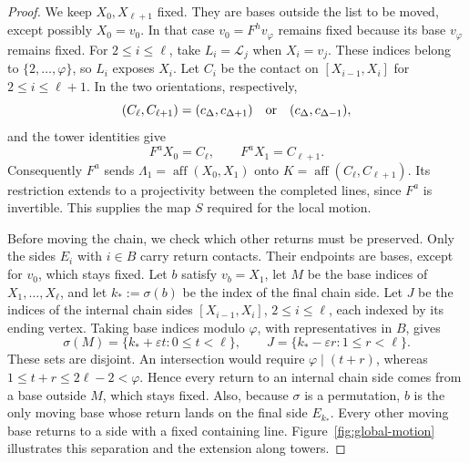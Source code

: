 \documentclass[11pt,a4paper]{article}
\DeclareMathOperator{\aff}{aff}
\theoremstyle{definition}
\theoremstyle{remark}
\numberwithin{equation}{section}
\begin{document}
\begin{proof}
We keep $X_0,X_{\ell+1}$ fixed. They are bases outside the list to be moved, except possibly $X_0=v_0$. In that case $v_0=F^hv_\varphi$ remains fixed because its base $v_\varphi$ remains fixed. For $2\le i\le\ell$, take $L_i=\mathcal L_j$ when $X_i=v_j$. These indices belong to $\{2,\ldots,\varphi\}$, so $L_i$ exposes $X_i$. Let $C_i$ be the contact on $[X_{i-1},X_i]$ for $2\le i\le\ell+1$. In the two orientations, respectively,
\[
 (C_\ell,C_{\ell+1})=(c_\Delta,c_{\Delta+1})
 \quad\hbox{or}\quad(c_\Delta,c_{\Delta-1}),
\]
and the tower identities give
\[
 F^aX_0=C_\ell,\qquad F^aX_1=C_{\ell+1}.
\]
Consequently $F^a$ sends $\Lambda_1=\aff(X_0,X_1)$ onto $K=\aff(C_\ell,C_{\ell+1})$. Its restriction extends to a projectivity between the completed lines, since $F^a$ is invertible. This supplies the map $S$ required for the local motion.

Before moving the chain, we check which other returns must be preserved. Only the sides $E_i$ with $i\in B$ carry return contacts. Their endpoints are bases, except for $v_0$, which stays fixed. Let $b$ satisfy $v_b=X_1$, let $M$ be the base indices of $X_1,\ldots,X_\ell$, and let $k_*:=\sigma(b)$ be the index of the final chain side. Let $J$ be the indices of the internal chain sides $[X_{i-1},X_i]$, $2\le i\le\ell$, each indexed by its ending vertex. Taking base indices modulo $\varphi$, with representatives in $B$, gives
\begin{equation}\label{eq:network-disjointness}
 \sigma(M)=\{k_*+\varepsilon t:0\le t<\ell\},\qquad
 J=\{k_*-\varepsilon r:1\le r<\ell\}.
\end{equation}
These sets are disjoint. An intersection would require $\varphi\mid(t+r)$, whereas $1\le t+r\le2\ell-2<\varphi$. Hence every return to an internal chain side comes from a base outside $M$, which stays fixed. Also, because $\sigma$ is a permutation, $b$ is the only moving base whose return lands on the final side $E_{k_*}$. Every other moving base returns to a side with a fixed containing line. Figure~\ref{fig:global-motion} illustrates this separation and the extension along towers.


\end{proof}
\end{document}
